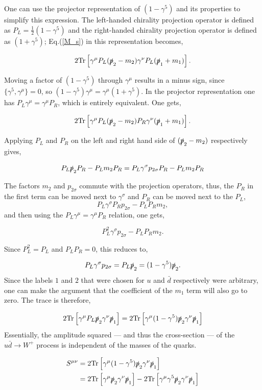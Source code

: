 \documentclass[a4paper,11pt]{article}
\begin{document}
One can use the projector representation of $(1-\gamma^5)$ and its properties to simplify this expression. The left-handed chirality projection operator is defined as $P_L = \frac{1}{2}(1-\gamma^5)$ and the right-handed chirality projection operator is defined as $(1+\gamma^5)$; Eq.(\ref{M_s}) in this representation becomes,

$$2\text{Tr}\left[\gamma^\mu P_L (\slashed{p}_2-m_2)\gamma^\nu P_L (\slashed{p}_1+m_1) \right].$$ 

 Moving a factor of $(1- \gamma^5)$ through $\gamma^\mu$ results in a minus sign, since $\{\gamma^5, \gamma^\mu\}=0$, so $(1 - \gamma^5)\gamma^\mu = \gamma^\mu(1+ \gamma^5)$. In the projector representation one has $P_L \gamma^\mu =\gamma^\mu P_R$, which is entirely equivalent. One gets,
 
 $$2\text{Tr}\left[\gamma^\mu P_L (\slashed{p}_2-m_2)P_R\gamma^\nu(\slashed{p}_1+m_1) \right].$$ 

Applying $P_L$ and $P_R$ on the left and right hand side of $(\slashed{p}_2-m_2)$ respectively gives,

$$P_L\slashed{p}_2 P_R - P_L m_2 P_R = P_L \gamma^\sigma p_{2\sigma} P_R - P_L m_2 P_R $$

The factors $m_2$ and $p_{2\sigma}$ commute with the projection operators, thus, the $P_R$ in the first term can be moved next to $\gamma^\sigma$ and $P_R$ can be moved next to the $P_L$,
$$P_L \gamma^\sigma P_R p_{2\sigma} - P_LP_R m_2,$$ 
and then using the $P_L \gamma^\mu =\gamma^\mu P_R$ relation, one gets,

$$P_L^2 \gamma^\sigma p_{2\sigma} - P_LP_R m_2.$$

Since $P_L^2 = P_L$ and $P_LP_R=0$, this reduces to,

$$P_L \gamma^\sigma p_{2\sigma} = P_L \slashed{p}_2 = (1-\gamma^5)\slashed{p}_2.$$
Since the labels $1$ and $2$ that were chosen for $u$ and $\bar{d}$ respectively were arbitrary, one can make the argument that the coefficient of the $m_1$ term will also go to zero. The trace is therefore,

 $$2\text{Tr}\left[\gamma^\mu P_L \slashed{p}_2\gamma^\nu\slashed{p}_1 \right]= 2\text{Tr}\left[\gamma^\mu (1-\gamma^5) \slashed{p}_2\gamma^\nu\slashed{p}_1\right] $$ 
Essentially, the amplitude squared --- and thus the cross-section --- of the $u \bar{d} \rightarrow W^+$ process is independent of the masses of the quarks.


\begin{equation}\label{traces1}
	\begin{aligned}
		S^{\mu\nu} &= 2\text{Tr}\left[\gamma^\mu (1-\gamma^5)\slashed{p}_2\gamma^\nu \slashed{p}_1\right] \\
		&=  2\text{Tr}\left[\gamma^\mu \slashed{p}_2\gamma^\nu \slashed{p}_1 \right] - 2\text{Tr}\left[ \gamma^\mu \gamma^5 \slashed{p}_2\gamma^\nu \slashed{p}_1 \right]
	\end{aligned}
\end{equation}
\end{document}
